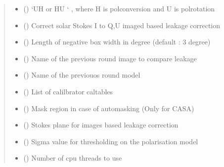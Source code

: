 \documentclass[letterpaper,10pt,english]{sphinxmanual}
\begin{document}
\begin{fulllineitems}
\begin{fulllineitems}
\begin{quote}
\begin{description}
\begin{itemize}
\item {} 
\sphinxAtStartPar
{} () \textendash{} ‘UH or HU ‘ , where H is polconversion and U is polrotation

\item {} 
\sphinxAtStartPar
{} () \textendash{} Correct solar Stokes I to Q,U imaged based leakage correction

\item {} 
\sphinxAtStartPar
{} () \textendash{} Length of negative box width in degree (default : 3 degree)

\item {} 
\sphinxAtStartPar
{} () \textendash{} Name of the previous round image to compare leakage

\item {} 
\sphinxAtStartPar
{} () \textendash{} Name of the previouos round model

\item {} 
\sphinxAtStartPar
{} () \textendash{} List of calilbrator caltables

\item {} 
\sphinxAtStartPar
{} () \textendash{} Mask region in case of auto\sphinxhyphen{}masking (Only for CASA)

\item {} 
\sphinxAtStartPar
{} () \textendash{} Stokes plane for images based leakage correction

\item {} 
\sphinxAtStartPar
{} () \textendash{} Sigma value for thresholding on the polarisation model

\item {} 
\sphinxAtStartPar
{} () \textendash{} Number of cpu threads to use


\end{itemize}
\end{description}
\end{quote}
\end{fulllineitems}
\end{fulllineitems}
\end{document}

